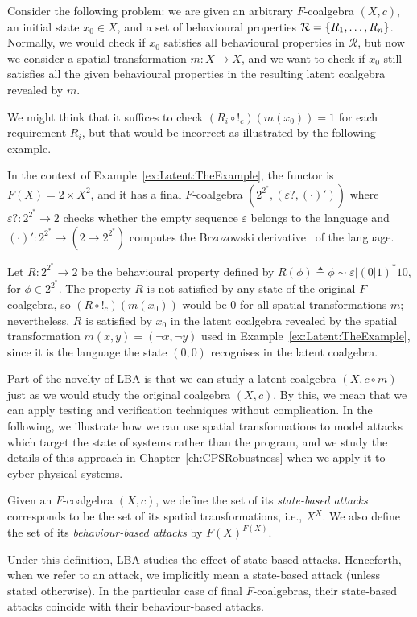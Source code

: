 Consider the following problem: we are given an arbitrary $F$-coalgebra $(X,c)$, an initial state $x_0\in X$, and a set of behavioural properties $\mathcal{R}=\left\{R_1, \ldots, R_n\right\}$. Normally, we would check if $x_0$ satisfies all behavioural properties in $\mathcal{R}$, but now we consider a spatial transformation $m\colon X\rightarrow X$, and we want to check if $x_0$ still satisfies all the given behavioural properties in the resulting latent coalgebra revealed by $m$.

We might think that it suffices to check $(R_i\circ !_c)(m(x_0))=1$ for each requirement $R_i$, but that would be incorrect as illustrated by the following example.
\begin{example}
    In the context of Example~\ref{ex:Latent:TheExample}, the functor is $F(X)=2\times X^2$, and it has a final $F$-coalgebra $(2^{2^*},(\varepsilon?,(\cdot)'))$ where $\varepsilon? \colon 2^{2^*}\rightarrow 2$ checks whether the empty sequence $\varepsilon$ belongs to the language and $(\cdot)'\colon 2^{2^*}\rightarrow (2\rightarrow {2^{2^*}})$ computes the Brzozowski derivative~\cite{BrzozowskiDerivative} of the language.  

    Let $R\colon 2^{2^*}\rightarrow 2$ be the behavioural property defined by $R(\phi)\triangleq \phi \sim \varepsilon|(0|1)^*10$, for $\phi \in 2^{2^*}$. The property $R$ is not satisfied by any state of the original $F$-coalgebra, so $(R\circ !_c)(m(x_0))$ would be 0 for all spatial transformations $m$; nevertheless, $R$ is satisfied by $x_0$ in the latent coalgebra revealed by the spatial transformation $m(x,y)=(\lnot x, \lnot y)$ used in Example~\ref{ex:Latent:TheExample}, since it is the language the state $(0,0)$ recognises in the latent coalgebra. 
\end{example}
Part of the novelty of LBA is that we can study a latent coalgebra $(X, c\circ m)$ just as we would study the original coalgebra $(X, c)$. By this, we mean that we can apply testing and verification techniques without complication. In the following, we illustrate how we can use spatial transformations to model attacks which target the state of systems rather than the program, and we study the details of this approach in Chapter~\ref{ch:CPSRobustness} when we apply it to cyber-physical systems.
\begin{definition}
    \label{def:Latent:StateAttacks}
    Given an $F$-coalgebra $(X,c)$, we define the set of its \emph{state-based attacks} corresponds to be the set of its spatial transformations, i.e., $X^X$. 
    We also define the set of its \emph{behaviour-based attacks} by $F(X)^{F(X)}$. 
    \end{definition}
Under this definition, LBA studies the effect of state-based attacks. Henceforth, when we refer to an attack, we implicitly mean a state-based attack (unless stated otherwise). In the particular case of final $F$-coalgebras, their state-based attacks coincide with their behaviour-based attacks. 

